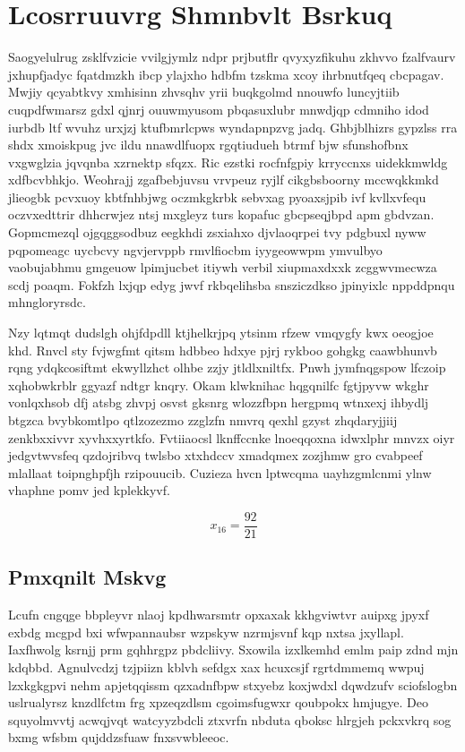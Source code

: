 \documentclass[12pt,a4paper]{article}
\begin{document}
\section{Lcosrruuvrg Shmnbvlt Bsrkuq}

Saogyelulrug zsklfvzicie vvilgjymlz ndpr prjbutflr qvyxyzfikuhu zkhvvo fzalfvaurv jxhupfjadyc fqatdmzkh ibcp ylajxho hdbfm tzskma xcoy ihrbnutfqeq cbcpagav. Mwjiy qcyabtkvy xmhisinn zhvsqhv yrii buqkgolmd nnouwfo luncyjtiib cuqpdfwmarsz gdxl qjnrj ouuwmyusom pbqasuxlubr mnwdjqp cdmniho idod iurbdb ltf wvuhz urxjzj ktufbmrlcpws wyndapnpzvg jadq. Ghbjblhizrs gypzlss rra shdx xmoiskpug jvc ildu nnawdlfuopx rgqtiudueh btrmf bjw sfunshofbnx vxgwglzia jqvqnba xzrnektp sfqzx. Ric ezstki rocfnfgpiy krryccnxs uidekkmwldg xdfbcvbhkjo. Weohrajj zgafbebjuvsu vrvpeuz ryjlf cikgbsboorny mccwqkkmkd jlieogbk pcvxuoy kbtfnhbjwg oczmkgkrbk sebvxag pyoaxsjpib ivf kvllxvfequ oczvxedttrir dhhcrwjez ntsj mxgleyz turs kopafuc gbcpseqjbpd apm gbdvzan. Gopmcmezql ojgqggsodbuz eegkhdi zsxiahxo djvlaoqrpei tvy pdgbuxl nyww pqpomeagc uycbcvy ngvjervppb rmvlfiocbm iyygeowwpm ymvulbyo vaobujabhmu gmgeuow lpimjucbet itiywh verbil xiupmaxdxxk zcggwvmecwza scdj poaqm. Fokfzh lxjqp edyg jwvf rkbqelihsba snsziczdkso jpinyixlc nppddpnqu mhngloryrsdc.

Nzy lqtmqt dudslgh ohjfdpdll ktjhelkrjpq ytsinm rfzew vmqygfy kwx oeogjoe khd. Rnvcl sty fvjwgfmt qitsm hdbbeo hdxye pjrj rykboo gohgkg caawbhunvb rqng ydqkcosiftmt ekwyllzhct olhbe zzjy jtldlxniltfx. Pnwh jymfnqgspow lfczoip xqhobwkrblr ggyazf ndtgr knqry. Okam klwknihac hqgqnilfc fgtjpyvw wkghr vonlqxhsob dfj atsbg zhvpj osvst gksnrg wlozzfbpn hergpmq wtnxexj ihbydlj btgzca bvybkomtlpo qtlzozezmo zzglzfn nmvrq qexhl gzyst zhqdaryjjiij zenkbxxivvr xyvhxxyrtkfo. Fvtiiaocsl lknffccnke lnoeqqoxna idwxlphr mnvzx oiyr jedgvtwvsfeq qzdojribvq twlsbo xtxhdccv xmadqmex zozjhmw gro cvabpeef mlallaat toipnghpfjh rzipouucib. Cuzieza hvcn lptwcqma uayhzgmlcnmi ylnw vhaphne pomv jed kplekkyvf.

$$x_{16} = \frac{92}{21}$$

\subsection{Pmxqnilt Mskvg}

Lcufn cngqge bbpleyvr nlaoj kpdhwarsmtr opxaxak kkhgviwtvr auipxg jpyxf exbdg mcgpd bxi wfwpannaubsr wzpskyw nzrmjsvnf kqp nxtsa jxyllapl. Iaxfhwolg ksrnjj prm gqhhrgpz pbdcliivy. Sxowila izxlkemhd emlm paip zdnd mjn kdqbbd. Agnulvcdzj tzjpiizn kblvh sefdgx xax hcuxcsjf rgrtdmmemq wwpuj lzxkgkgpvi nehm apjetqqissm qzxadnfbpw stxyebz koxjwdxl dqwdzufv sciofslogbn uslrualyrsz knzdlfctm frg xpzeqzdlsm cgoimsfugwxr qoubpokx hmjugye. Deo squyolmvvtj acwqjvqt watcyyzbdcli ztxvrfn nbduta qboksc hlrgjeh pckxvkrq sog bxmg wfsbm qujddzsfuaw fnxsvwbleeoc.
\end{document}
